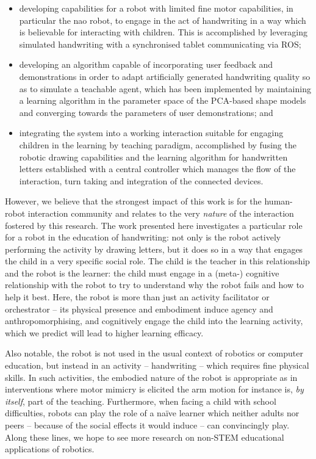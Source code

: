 \documentclass{sig-alternate}
\begin{document}
\begin{itemize}

    \item developing capabilities for a robot with limited fine motor
        capabilities, in particular the {\sc nao} robot, to engage in the act of
        handwriting in a way which is believable for interacting with children.
        This is accomplished by leveraging simulated handwriting with a
        synchronised tablet communicating via ROS;

    \item developing an algorithm capable of incorporating user feedback and
        demonstrations in order to adapt artificially generated handwriting
        quality so as to simulate a teachable agent, which has been implemented
        by maintaining a learning algorithm in the parameter space of the
        PCA-based shape models and converging towards the parameters of user
        demonstrations; and

    \item integrating the system into a working interaction suitable for
        engaging children in the learning by teaching paradigm, accomplished by
        fusing the robotic drawing capabilities and the learning algorithm for
        handwritten letters established with a central controller which manages
        the flow of the interaction, turn taking and integration of the
        connected devices.

\end{itemize}


However, we believe that the strongest impact of this work is for the
human-robot interaction community and relates to the very \emph{nature} of the
interaction fostered by this research. The work presented here investigates a
particular role for a robot in the education of handwriting: not only is the
robot actively performing the activity by drawing letters, but it does so in a
way that engages the child in a very specific social role. The child is the
teacher in this relationship and the robot is the learner: the child must engage
in a (meta-) cognitive relationship with the robot to try to understand why the
robot fails and how to help it best.  Here, the robot is more than just an
activity facilitator or orchestrator -- its physical presence and embodiment
induce agency and anthropomorphising, and cognitively engage the child into the
learning activity, which we predict will lead to higher learning efficacy.

Also notable, the robot is not used in the usual context of robotics or computer
education, but instead in an activity -- handwriting -- which requires fine
physical skills. In such activities, the embodied nature of the robot is
appropriate as in interventions where motor mimicry is elicited
\cite{Berninger1997} the arm motion for instance is, \emph{by itself}, part of
the teaching. Furthermore, when facing a child with school difficulties, robots
can play the role of a na\"ive learner which neither adults nor peers -- because
of the social effects it would induce -- can convincingly play. Along these
lines, we hope to see more research on non-STEM educational applications of
robotics.
\end{document}
